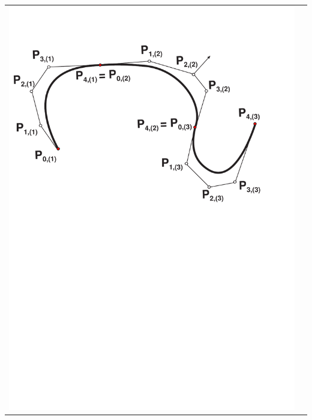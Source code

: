 \documentclass[ebook,oneside]{memoir}
\begin{document}
\begin{center}
\begin{tabular}{cc}
\includegraphics[scale=0.45]{3_24a.pdf} &

\end{tabular}
\end{center}
\end{document}
